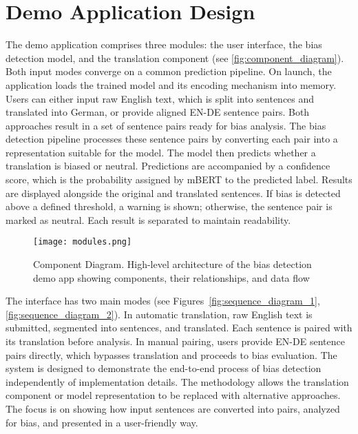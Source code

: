 \section{Demo Application Design}
    The demo application comprises three modules: the user interface, the bias detection model, and the translation component (see \autoref{fig:component_diagram}). Both input modes converge on a common prediction pipeline. On launch, the application loads the trained model and its encoding mechanism into memory. Users can either input raw English text, which is split into sentences and translated into German, or provide aligned EN-DE sentence pairs. Both approaches result in a set of sentence pairs ready for bias analysis. The bias detection pipeline processes these sentence pairs by converting each pair into a representation suitable for the model. The model then predicts whether a translation is biased or neutral. Predictions are accompanied by a confidence score, which is the probability assigned by mBERT to the predicted label. Results are displayed alongside the original and translated sentences. If bias is detected above a defined threshold, a warning is shown; otherwise, the sentence pair is marked as neutral. Each result is separated to maintain readability.

    \vspace{0.8em}
    \begin{figure}[htb]
    \centering
    \texttt{[image: modules.png]}
    \caption[Component Diagram]{Component Diagram. High-level architecture of the bias detection demo app showing components, their relationships, and data flow}
    \label{fig:component_diagram}
    \end{figure}

    The interface has two main modes (see Figures~\ref{fig:sequence_diagram_1}, \ref{fig:sequence_diagram_2}). In automatic translation, raw English text is submitted, segmented into sentences, and translated. Each sentence is paired with its translation before analysis. In manual pairing, users provide EN-DE sentence pairs directly, which bypasses translation and proceeds to bias evaluation. The system is designed to demonstrate the end-to-end process of bias detection independently of implementation details. The methodology allows the translation component or model representation to be replaced with alternative approaches. The focus is on showing how input sentences are converted into pairs, analyzed for bias, and presented in a user-friendly way. 


